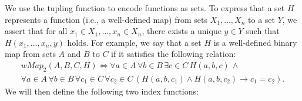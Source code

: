 \documentclass{article}
\theoremstyle{definition}
\theoremstyle{theorem}
\theoremstyle{theorem}
\theoremstyle{remark}
\theoremstyle{remark}
\theoremstyle{example}
\theoremstyle{notation}
\theoremstyle{theorem}
\begin{document}
We use the tupling function to encode functions as sets. To express that a set $H$ represents a function (i.e., a well-defined map) from sets $X_1, \ldots, X_n$ to a set $Y$, we assert that for all $x_1 \in X_1, \ldots, x_n \in X_n$, there exists a unique $y \in Y$ such that $H(x_1, \ldots, x_n, y)$ holds. For example, we say that a set $H$ is a well-defined binary map from sets $A$ and $B$ to $C$ if it satisfies the following relation:
\begin{equation}
\begin{gathered}
wMap_2(A, B, C, H) \iff \forall a \in A\, \forall b \in B\, \exists c \in C\, H(a, b, c)\, \wedge \\
\forall a \in A\, \forall b \in B\, \forall c_1 \in C\, \forall c_2 \in C\, (H(a, b, c_1) \wedge H(a, b, c_2) \rightarrow c_1 = c_2).
\end{gathered}
\end{equation}
We will then define the following two index functions:
\end{document}
